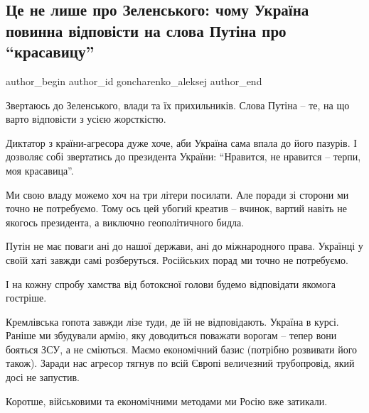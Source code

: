  
 
 
 
 
 
\subsection{Це не лише про Зеленського: чому Україна повинна відповісти на слова Путіна про \enquote{красавицу}}
\label{sec:08_02_2022.stz.news.ua.pravda.1.putin_krasavica}
 
\ifcmt
 author_begin
   author_id goncharenko_aleksej
 author_end
\fi

Звертаюсь до Зеленського, влади та їх прихильників. Слова Путіна – те, на що
варто відповісти з усією жорсткістю.

Диктатор з країни-агресора дуже хоче, аби Україна сама впала до його пазурів. І
дозволяє собі звертатись до президента України: \enquote{Нравится, не нравится – терпи,
моя красавица}.

Ми свою владу можемо хоч на три літери посилати. Але поради зі сторони ми точно
не потребуємо. Тому ось цей убогий креатив – вчинок, вартий навіть не якогось
президента, а виключно геополітичного бидла.

Путін не має поваги ані до нашої держави, ані до міжнародного права. Українці у
своїй хаті завжди самі розберуться. Російських порад ми точно не потребуємо.

І на кожну спробу хамства від ботоксної голови будемо відповідати якомога
гостріше.

Кремлівська гопота завжди лізе туди, де їй не відповідають. Україна в курсі.
Раніше ми збудували армію, яку доводиться поважати ворогам – тепер вони бояться
ЗСУ, а не сміються. Маємо економічний базис (потрібно розвивати його також).
Заради нас агресор тягнув по всій Європі величезний трубопровід, який досі не
запустив.

Коротше, військовими та економічними методами ми Росію вже затикали.

